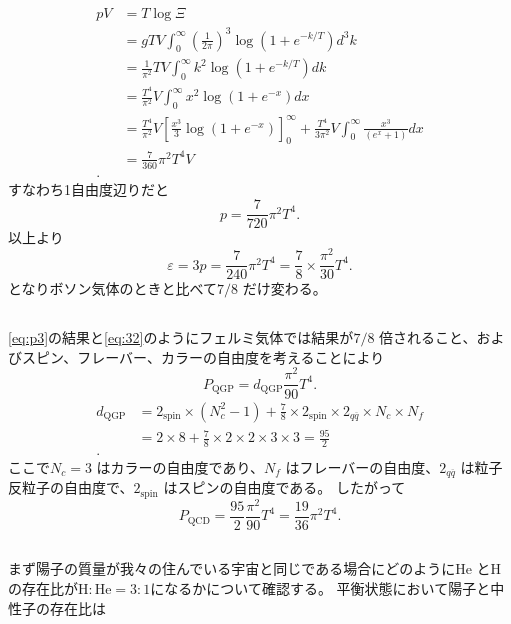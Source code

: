 \documentclass[dvipdfmx]{jsarticle}
\begin{document}
\begin{align*}
	pV&= T\log \Xi \\
	&= gTV \int_{0}^{\infty}\left( \frac{1}{2\pi} \right) ^3\log (1+e^{-k /T})d^3k   \\
	&= \frac{1}{\pi^2}TV \int_{0}^{\infty} k^2\log (1+e^{-k /T})dk  \\
	&= \frac{T^{4}}{\pi^2}V \int_{0}^{\infty} x^2\log (1+e^{-x})dx  \\
	&= \frac{T^{4}}{\pi^2}V\left[ \frac{x^3}{3}\log (1+e^{-x}) \right] _{0}^{\infty}+\frac{T^{4}}{3\pi^2}V \int_{0}^{\infty} \frac{x^3}{(e^{x}+1)}dx  \\
	&=\frac{7}{360}\pi^2T^{4}V  \\
.\end{align*}
すなわち1自由度辺りだと
\[
p=\frac{7}{720}\pi^2T^{4}
.\] 
以上より
\begin{equation}
\label{eq:32}
	\varepsilon=3p= \frac{7}{240}\pi^2T^{4}=\frac{7}{8}\times \frac{\pi^2}{30}T^{4}
.\end{equation}
となりボソン気体のときと比べて$7 /8$ だけ変わる。
\subsection{}
\eqref{eq:p3}の結果と\eqref{eq:32}のようにフェルミ気体では結果が$7 /8$ 倍されること、およびスピン、フレーバー、カラーの自由度を考えることにより
\[
	P_\text{QGP} =d_\text{QGP} \frac{\pi^2}{90}T^{4}
.\] 
\begin{align*}
	d_\text{QGP} &=2_\text{spin} \times (N_c^2-1)+\frac{7}{8}\times 2_\text{spin} \times 2_{q\overline{q}}\times N_c\times N_f \\
	&= 2\times 8+\frac{7}{8}\times 2\times 2\times 3\times 3=\frac{95}{2} \\
.\end{align*}
ここで$N_c=3$ はカラーの自由度であり、$N_f$ はフレーバーの自由度、$2_{q\overline{q}}$ は粒子反粒子の自由度で、$2_\text{spin} $ はスピンの自由度である。
したがって
\[
P_\text{QCD} =\frac{95}{2}\frac{\pi^2}{90}T^{4}=\frac{19}{36}\pi^2T^{4}
.\] 
\subsection{}
まず陽子の質量が我々の住んでいる宇宙と同じである場合にどのように$\mathrm{He}$ と$\mathrm{H}$ の存在比が$\mathrm{H}:\mathrm{He}=3:1$になるかについて確認する。
平衡状態において陽子と中性子の存在比は
	
\end{document}
